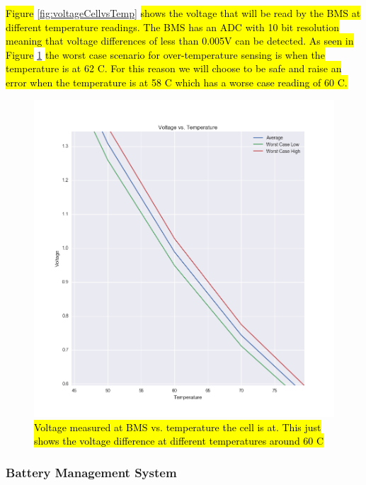 \documentclass{article}
\DeclareRobustCommand{\hlr}[1]{{\sethlcolor{red}\hl{#1}}}
\begin{document}
            \hlr{Figure} \ref{fig:voltageCellvsTemp} \hlr{shows the voltage that will be read by the BMS at different temperature readings. The BMS has an ADC with 10 bit resolution meaning that voltage differences of less than 0.005V can be detected. As seen in Figure }\ref{fig:voltageCellvsTempZOOM} \hlr{the worst case scenario for over-temperature sensing is when the temperature is at 62 \degree C. For this reason we will choose to be safe and raise an error when the temperature is at 58 \degree C which has a worse case reading of 60 \degree C.}

                \begin{figure}[H]
                \centering
                \includegraphics[width =0.6 \textwidth]{VoltageVSTempZOOM.png}
                \caption{\hlr{Voltage measured at BMS vs. temperature the cell is at. This just shows the voltage difference at different temperatures around 60 \degree C}}
                \label{fig:voltageCellvsTempZOOM}
                \end{figure}

        \subsubsection{Battery Management System} \label{bms}

\end{document}
